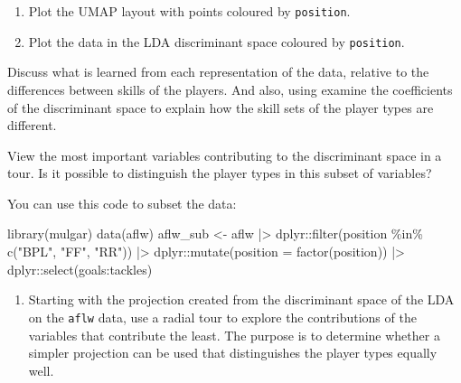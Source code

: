 \documentclass[
  letterpaper,
]{krantz}
\newenvironment{Shaded}{\begin{snugshade}}{\end{snugshade}}
\newcommand{\AttributeTok}[1]{\textcolor[rgb]{0.40,0.45,0.13}{#1}}
\newcommand{\FunctionTok}[1]{\textcolor[rgb]{0.28,0.35,0.67}{#1}}
\newcommand{\NormalTok}[1]{\textcolor[rgb]{0.00,0.23,0.31}{#1}}
\newcommand{\OtherTok}[1]{\textcolor[rgb]{0.00,0.23,0.31}{#1}}
\newcommand{\SpecialCharTok}[1]{\textcolor[rgb]{0.37,0.37,0.37}{#1}}
\newcommand{\StringTok}[1]{\textcolor[rgb]{0.13,0.47,0.30}{#1}}
\providecommand{\tightlist}{%
  \setlength{\itemsep}{0pt}\setlength{\parskip}{0pt}}
\begin{document}
\begin{enumerate}
  \begin{enumerate}
  \def\labelenumii{\alph{enumii}.}
  \tightlist
  \item
    Plot the UMAP layout with points coloured by \texttt{position}.
  \item
    Plot the data in the LDA discriminant space coloured by
    \texttt{position}.
  \end{enumerate}

  Discuss what is learned from each representation of the data, relative
  to the differences between skills of the players. And also, using
  examine the coefficients of the discriminant space to explain how the
  skill sets of the player types are different.

  View the most important variables contributing to the discriminant
  space in a tour. Is it possible to distinguish the player types in
  this subset of variables?

  You can use this code to subset the data:
\end{enumerate}

\begin{Shaded}
\begin{Highlighting}[]
\FunctionTok{library}\NormalTok{(mulgar)}
\FunctionTok{data}\NormalTok{(aflw)}
\NormalTok{aflw\_sub }\OtherTok{\textless{}{-}}\NormalTok{ aflw }\SpecialCharTok{|\textgreater{}} 
\NormalTok{  dplyr}\SpecialCharTok{::}\FunctionTok{filter}\NormalTok{(position }\SpecialCharTok{\%in\%} \FunctionTok{c}\NormalTok{(}\StringTok{"BPL"}\NormalTok{, }\StringTok{"FF"}\NormalTok{, }\StringTok{"RR"}\NormalTok{)) }\SpecialCharTok{|\textgreater{}}
\NormalTok{  dplyr}\SpecialCharTok{::}\FunctionTok{mutate}\NormalTok{(}\AttributeTok{position =} \FunctionTok{factor}\NormalTok{(position)) }\SpecialCharTok{|\textgreater{}}
\NormalTok{  dplyr}\SpecialCharTok{::}\FunctionTok{select}\NormalTok{(goals}\SpecialCharTok{:}\NormalTok{tackles)}
\end{Highlighting}
\end{Shaded}

\begin{enumerate}
\def\labelenumi{\arabic{enumi}.}
\setcounter{enumi}{11}
\tightlist
\item
  Starting with the projection created from the discriminant space of
  the LDA on the \texttt{aflw} data, use a radial tour to explore the
  contributions of the variables that contribute the least. The purpose
  is to determine whether a simpler projection can be used that
  distinguishes the player types equally well.
\end{enumerate}
\end{document}

